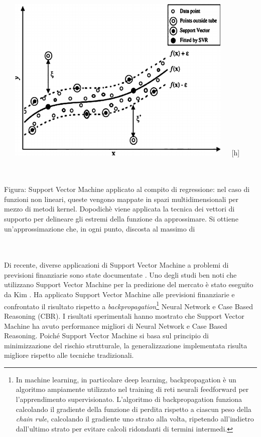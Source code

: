 \documentclass[a4paper,12pt]{report}
\begin{document}
\begin{fig}
	\begin{center}
		\includegraphics[width=12cm,height=8cm]{svm1}[h]
	\end{center}
	\caption{\\~\\Figura: Support Vector Machine applicato al compito di regressione: nel caso di funzioni non lineari, queste vengono mappate in spazi multidimensionali per mezzo di metodi kernel. Dopodichè viene applicata la tecnica dei vettori di supporto per delineare gli estremi della funzione da approssimare. Si ottiene un'approssimazione che, in ogni punto, discosta al massimo di \varepsilon {}}
\end{fig}

\\~\\Di recente, diverse applicazioni di Support Vector Machine a problemi di previsioni finanziarie sono state documentate \cite{15}\cite{38}\cite{39}. Uno degli studi ben noti che utilizzano Support Vector Machine per la predizione del mercato è stato eseguito da Kim \cite{15}. Ha applicato Support Vector Machine alle previsioni finanziarie e confrontato il risultato rispetto a \textit{backpropagation}\footnote{In machine learning, in particolare deep learning, backpropagation è un algoritmo ampiamente utilizzato nel training di reti neurali feedforward per l'apprendimento supervisionato. L'algoritmo di backpropagation funziona calcolando il gradiente della funzione di perdita rispetto a ciascun peso della \textit{chain rule}, calcolando il gradiente uno strato alla volta, ripetendo all'indietro dall'ultimo strato per evitare calcoli ridondanti di termini intermedi.} Neural Network e Case Based Reasoning (CBR). I risultati sperimentali hanno mostrato che Support Vector Machine ha avuto performance migliori di Neural Network e Case Based Reasoning. Poiché Support Vector Machine si basa sul principio di minimizzazione del rischio strutturale, la generalizzazione implementata risulta migliore rispetto alle tecniche tradizionali.
\end{document}
